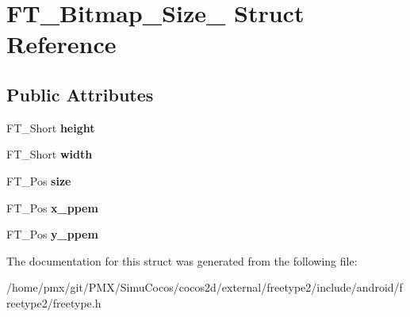 \hypertarget{structFT__Bitmap__Size__}{}\section{F\+T\+\_\+\+Bitmap\+\_\+\+Size\+\_\+ Struct Reference}
\label{structFT__Bitmap__Size__}
\subsection*{Public Attributes}
\begin{DoxyCompactItemize}
\item 
\mbox{\label{structFT__Bitmap__Size___adf2f24039b458ff4674712886f242262}} 
F\+T\+\_\+\+Short {\bfseries height}
\item 
\mbox{\label{structFT__Bitmap__Size___ab9da94223f75a89a649d1e6d018b17f1}} 
F\+T\+\_\+\+Short {\bfseries width}
\item 
\mbox{\label{structFT__Bitmap__Size___a1db23a6220fb6bcb712430821a6e5352}} 
F\+T\+\_\+\+Pos {\bfseries size}
\item 
\mbox{\label{structFT__Bitmap__Size___a6f877a792d2dc93328037c928979215f}} 
F\+T\+\_\+\+Pos {\bfseries x\+\_\+ppem}
\item 
\mbox{\label{structFT__Bitmap__Size___a60d4d003d09fd57505f69f39e31e19c1}} 
F\+T\+\_\+\+Pos {\bfseries y\+\_\+ppem}
\end{DoxyCompactItemize}


The documentation for this struct was generated from the following file\+:\begin{DoxyCompactItemize}
\item 
/home/pmx/git/\+P\+M\+X/\+Simu\+Cocos/cocos2d/external/freetype2/include/android/freetype2/freetype.\+h\end{DoxyCompactItemize}
